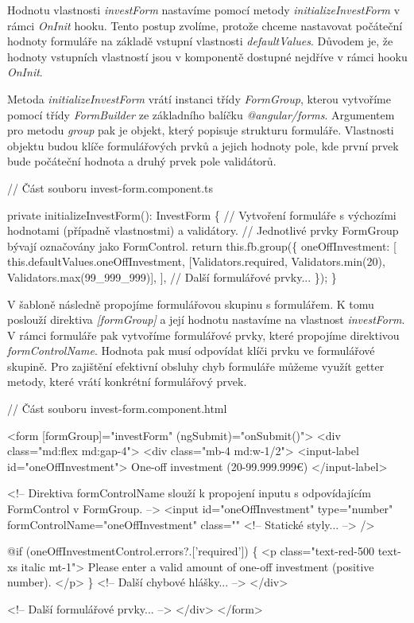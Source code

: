 Hodnotu vlastnosti \emph{investForm} nastavíme pomocí metody \emph{initializeInvestForm} v rámci \emph{OnInit} hooku. 
Tento postup zvolíme, protože chceme nastavovat počáteční hodnoty formuláře na základě vstupní vlastnosti \emph{defaultValues}.
Důvodem je, že hodnoty vstupních vlastností jsou v komponentě dostupné nejdříve v rámci hooku \emph{OnInit}.

Metoda \emph{initializeInvestForm} vrátí instanci třídy \emph{FormGroup}, kterou vytvoříme pomocí třídy \emph{FormBuilder} ze základního balíčku \emph{@angular/forms}. 
Argumentem pro metodu \emph{group} pak je objekt, který popisuje strukturu formuláře. 
Vlastnosti objektu budou klíče formulářových prvků a jejich hodnoty pole, kde první prvek bude počáteční hodnota a druhý prvek pole validátorů.

\begin{prog}
// Část souboru invest-form.component.ts

private initializeInvestForm(): InvestForm \{
  // Vytvoření formuláře s výchozími hodnotami 
    (případně vlastnostmi) a validátory.
  // Jednotlivé prvky FormGroup bývají označovány jako FormControl.
  return this.fb.group(\{
    oneOffInvestment: [
      this.defaultValues.oneOffInvestment,
      [Validators.required, Validators.min(20), Validators.max(99_999_999)],
    ],
    // Další formulářové prvky... 
  \});
\}
\end{prog}

V šabloně následně propojíme formulářovou skupinu s formulářem. K tomu poslouží direktiva \emph{[formGroup]} a její hodnotu nastavíme na vlastnost \emph{investForm}. 
V rámci formuláře pak vytvoříme formulářové prvky, které propojíme direktivou \emph{formControlName}. Hodnota pak musí odpovídat klíči prvku ve formulářové skupině. 
Pro zajištění efektivní obsluhy chyb formuláře můžeme využít getter metody, které vrátí konkrétní formulářový prvek.

\begin{prog}
// Část souboru invest-form.component.html

<form [formGroup]="investForm" (ngSubmit)="onSubmit()">
  <div class="md:flex md:gap-4">
    <div class="mb-4 md:w-1/2">
      <input-label id="oneOffInvestment">
        One-off investment (20-99.999.999€)
      </input-label>

      <!-- Direktiva formControlName slouží k propojení inputu 
        s odpovídajícím FormControl v FormGroup. -->
      <input
        id="oneOffInvestment"
        type="number"
        formControlName="oneOffInvestment"
        class="" <!-- Statické styly... -->
      />

      @if (oneOffInvestmentControl.errors?.['required']) \{
        <p class="text-red-500 text-xs italic mt-1">
          Please enter a valid amount of one-off investment (positive number).
        </p>
      \}
      <!-- Další chybové hlášky... -->
    </div>

    <!-- Další formulářové prvky... -->
  </div>
</form>
\end{prog}

